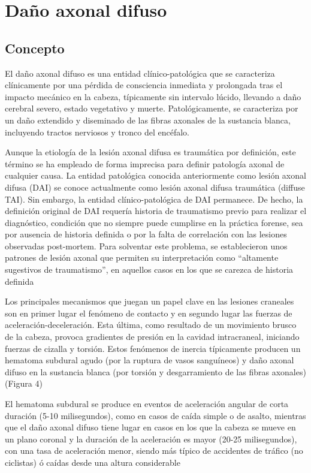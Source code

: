 \section{Daño axonal difuso}
\subsection{Concepto} \cite{Davceva2015} \cite{Gaetz2004} \cite{Johnson2013} \cite{Profyris2004} \cite{Stoica2010}
El daño axonal difuso es una entidad clínico-patológica que se caracteriza clínicamente por una pérdida de consciencia inmediata y prolongada tras el impacto mecánico en la cabeza, típicamente sin intervalo lúcido, llevando a daño cerebral severo, estado vegetativo y muerte. Patológicamente, se caracteriza por un daño extendido y diseminado de las fibras axonales de la sustancia blanca, incluyendo tractos nerviosos y tronco del encéfalo.

Aunque la etiología de la lesión axonal difusa es traumática por definición, este término se ha empleado de forma imprecisa para definir patología axonal de cualquier causa. La entidad patológica conocida anteriormente como lesión axonal difusa (DAI) se conoce actualmente como lesión axonal difusa traumática (diffuse TAI). Sin embargo, la entidad clínico-patológica de DAI permanece. De hecho, la definición original de DAI requería historia de traumatismo previo para realizar el diagnóstico, condición que no siempre puede cumplirse en la práctica forense, sea por ausencia de historia definida o por la falta de correlación con las lesiones observadas post-mortem. Para solventar este problema, se establecieron unos patrones de lesión axonal que permiten su interpretación como “altamente sugestivos de traumatismo”, en aquellos casos en los que se carezca de historia definida \cite{Reichard2005}

Los principales mecanismos que juegan un papel clave en las lesiones craneales son en primer lugar el fenómeno de contacto y en segundo lugar las fuerzas de aceleración-deceleración\cite{Gaetz2004}. Esta última, como resultado de un movimiento brusco de la cabeza, provoca gradientes de presión en la cavidad intracraneal, iniciando fuerzas de cizalla y torsión. Estos fenómenos de inercia típicamente producen un hematoma subdural agudo (por la ruptura de vasos sanguíneos) y daño axonal difuso en la sustancia blanca (por torsión y desgarramiento de las fibras axonales) (Figura 4)

El hematoma subdural se produce en eventos de aceleración angular de corta duración (5-10 milisegundos), como en casos de caída simple o de asalto, mientras que el daño axonal difuso tiene lugar en casos en los que la cabeza se mueve en un plano coronal y la duración de la aceleración es mayor (20-25 milisegundos), con una tasa de aceleración menor, siendo más típico de accidentes de tráfico (no ciclistas) ó caídas desde una altura considerable \cite{Oehmichen1998}

